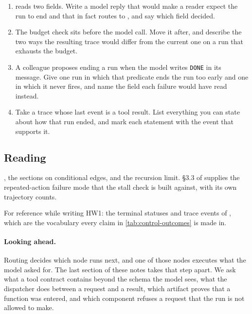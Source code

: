 \begin{enumerate}
\item {} reads two fields. Write a model reply that would make a reader
  expect the run to end and that in fact routes to , and say which field decided.
\item The budget check sits before the model call. Move it after, and describe the two ways the
  resulting trace would differ from the current one on a run that exhausts the budget.
\item A colleague proposes ending a run when the model writes \verb|DONE| in its message. Give one
  run in which that predicate ends the run too early and one in which it never fires, and name the
  field each failure would have read instead.
\item Take a trace whose last event is a tool result. List everything you can state about how that
  run ended, and mark each statement with the event that supports it.
\end{enumerate}

\subsection{Reading}

\citet{langgraph-graph-api}, the sections on conditional edges,  and the
recursion limit. \S3.3 of \citet{yao2023react} supplies the repeated-action failure mode that the
stall check is built against, with its own trajectory counts.

For reference while writing HW1: the terminal statuses and trace events of , which
are the vocabulary every claim in \cref{tab:control-outcomes} is made in.

\paragraph{Looking ahead.} Routing decides which node runs next, and one of those nodes executes
what the model asked for. The last section of these notes takes that step apart. We ask what a tool
contract contains beyond the schema the model sees, what the dispatcher does between a request and a
result, which artifact proves that a function was entered, and which component refuses a request
that the run is not allowed to make.
